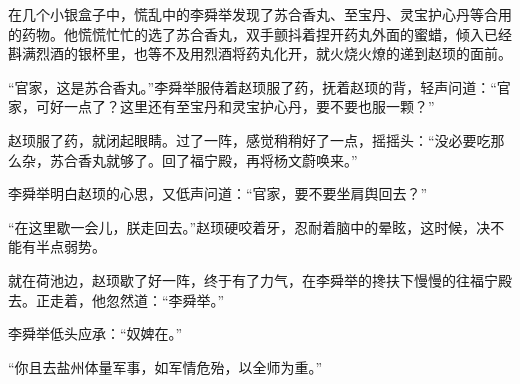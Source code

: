 在几个小银盒子中，慌乱中的李舜举发现了苏合香丸、至宝丹、灵宝护心丹等合用的药物。他慌慌忙忙的选了苏合香丸，双手颤抖着捏开药丸外面的蜜蜡，倾入已经斟满烈酒的银杯里，也等不及用烈酒将药丸化开，就火烧火燎的递到赵顼的面前。

“官家，这是苏合香丸。”李舜举服侍着赵顼服了药，抚着赵顼的背，轻声问道：“官家，可好一点了？这里还有至宝丹和灵宝护心丹，要不要也服一颗？”

赵顼服了药，就闭起眼睛。过了一阵，感觉稍稍好了一点，摇摇头：“没必要吃那么杂，苏合香丸就够了。回了福宁殿，再将杨文蔚唤来。”

李舜举明白赵顼的心思，又低声问道：“官家，要不要坐肩舆回去？”

“在这里歇一会儿，朕走回去。”赵顼硬咬着牙，忍耐着脑中的晕眩，这时候，决不能有半点弱势。

就在荷池边，赵顼歇了好一阵，终于有了力气，在李舜举的搀扶下慢慢的往福宁殿去。正走着，他忽然道：“李舜举。”

李舜举低头应承：“奴婢在。”

“你且去盐州体量军事，如军情危殆，以全师为重。”

